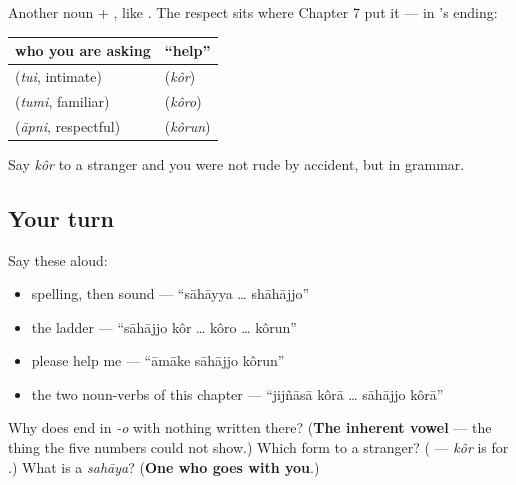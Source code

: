 \begin{grammarlens}[title={Grammar Lens: asking for help is where the respect ladder bites}]
Another noun + , like  . The respect sits where Chapter 7 put it — in ’s ending:

\noindent
\begin{tabularx}{\linewidth}{@{}>{\raggedright\arraybackslash}X>{\raggedright\arraybackslash}X@{}}
\toprule
\textbf{who you are asking} & \textbf{\textquotedblleft{}help\textquotedblright{}} \\
\midrule
\bn{তুই} (\emph{tui}, intimate) & \bn{সাহায্য} \bn{কর} (\emph{kôr}) \\
\bn{তুমি} (\emph{tumi}, familiar) & \bn{সাহায্য} \bn{করো} (\emph{kôro}) \\
\bn{আপনি} (\emph{āpni}, respectful) & \bn{সাহায্য} \bn{করুন} (\emph{kôrun}) \\
\bottomrule
\end{tabularx}

Say \emph{kôr} to a stranger and you were not rude by accident, but in grammar.
\end{grammarlens}

\subsection*{Your turn}
Say these aloud:

\begin{itemize}
\raggedright
  \item spelling, then sound — \textquotedblleft{}sāhāyya … shāhājjo\textquotedblright{}
  \item the ladder — \textquotedblleft{}sāhājjo kôr … kôro … kôrun\textquotedblright{}
  \item please help me — \textquotedblleft{}āmāke sāhājjo kôrun\textquotedblright{}
  \item the two noun-verbs of this chapter — \textquotedblleft{}jijñāsā kôrā … sāhājjo kôrā\textquotedblright{}
\end{itemize}

\begin{tcolorbox}[breakable,colback=teal!4,colframe=teal!35!black,title={Before you move on}]
Why does  end in \emph{-o} with nothing written there? (\textbf{The inherent vowel} — the thing the five numbers could not show.) Which form to a stranger? (\textbf{} — \emph{kôr} is for .) What is a \emph{sahāya}? (\textbf{One who goes with you}.)
\end{tcolorbox}
